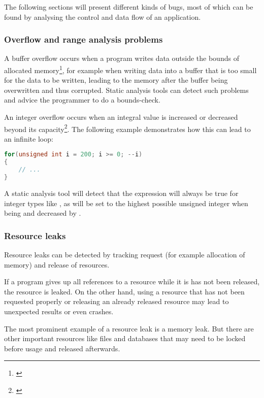 The following sections will present different kinds of bugs, most of which can be found by analysing the control and data flow of an application.

\subsubsection{Overflow and range analysis problems}

A buffer overflow occurs when a program writes data outside the bounds of allocated memory\footnote{\citep[175]{SecureProgramming}}, for example when writing data into a buffer that is too small for the data to be written, leading to the memory after the buffer being overwritten and thus corrupted. Static analysis tools can detect such problems and advice the programmer to do a bounds-check.

An integer overflow occurs when an integral value is increased or decreased beyond its capacity\footnote{\citep[235]{SecureProgramming}}. The following example demonstrates how this can lead to an infinite loop:

\SingleSpacing
\begin{lstlisting}[language=C++, caption=Integer ''underflow'' in \myProperName{C++}]
for(unsigned int i = 200; i >= 0; --i)
{
	// ...
}
\end{lstlisting}
\OnehalfSpacing

A static analysis tool will detect that the expression  will always be true for  integer types like , as  will be set to the highest possible unsigned integer when being  and decreased by .

\subsubsection{Resource leaks}

Resource leaks can be detected by tracking request (for example allocation of memory) and release of resources.

If a program gives up all references to a resource while it is has not been released, the resource is leaked. On the other hand, using a resource that has not been requested properly or releasing an already released resource may lead to unexpected results or even crashes.

The most prominent example of a resource leak is a memory leak. But there are other important resources like files and databases that may need to be locked before usage and released afterwards.

